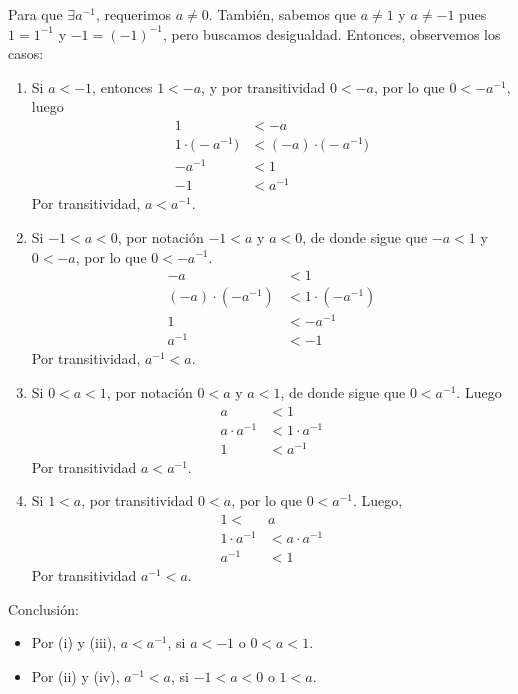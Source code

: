 \documentclass[11pt]{article}
\begin{document}
\begin{enumerate}[label=\alph*)]
    Para que $\exists a^{-1}$, requerimos $a\neq 0$. También, sabemos que $a\neq 1$ y $a\neq -1$ pues $1=1^{-1}$ y $-1=(-1)^{-1}$, pero buscamos desigualdad. Entonces, observemos los casos: \begin{enumerate}[label=\roman*)]
        \item Si $a<-1$, entonces $1<-a$, y por transitividad $0<-a$, por lo que $0<-a^{-1}$, luego \begin{align*}
            1 &< -a \\
            1\cdot \bigl(-a^{-1}\bigr) &< (-a) \cdot \bigl(-a^{-1}\bigr)\\
            -a^{-1} &< 1\\
            -1 &< a^{-1}
        \end{align*} Por transitividad, $a < a^{-1}$.
        \item Si $-1<a<0$, por notación $-1<a$ y $a<0$, de donde sigue que $-a<1$ y $0<-a$, por lo que $0<-a^{-1}$. \begin{align*}
            -a &< 1 \\
            (-a) \cdot (-a^{-1}) &< 1\cdot (-a^{-1})\\
            1 &< -a^{-1}\\
            a^{-1} &< -1
        \end{align*} Por transitividad, $a^{-1}<a$.
        \item Si $0<a<1$, por notación $0<a$ y $a<1$, de donde sigue que $0<a^{-1}$. Luego \begin{align*}
            a &< 1 \\
            a\cdot a^{-1} &< 1 \cdot a^{-1}\\
            1 &< a^{-1}
        \end{align*} Por transitividad $a<a^{-1}$.
        \item Si $1<a$, por transitividad $0<a$, por lo que $0<a^{-1}$. Luego, \begin{align*}
            1 <& a\\
            1 \cdot a^{-1} &< a \cdot a^{-1}\\
            a^{-1} &< 1
        \end{align*} Por transitividad $a^{-1}<a$.
    \end{enumerate}

    Conclusión: \begin{itemize}
        \item Por (i) y (iii), $a<a^{-1}$, si $a<-1$ o $0<a<1$.
        \item Por (ii) y (iv), $a^{-1}<a$, si $-1<a<0$ o $1<a$.
    \end{itemize}


\end{enumerate}
\end{document}
